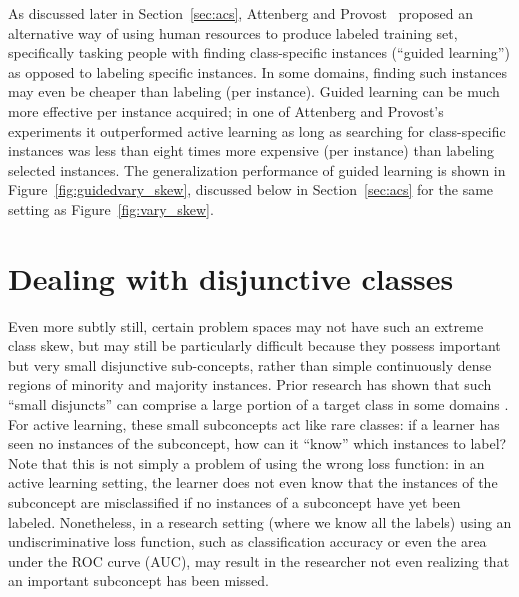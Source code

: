 As discussed later in Section~\ref{sec:acs}, Attenberg and Provost~\cite{attprovkdd2010} proposed an alternative way of using human resources to produce labeled training set, specifically tasking people with finding class-specific instances (``guided learning'') as opposed to labeling specific instances.  In some domains, finding such instances may even be cheaper than labeling (per instance).  Guided learning can be much more effective per instance acquired; in one of Attenberg and Provost's experiments it outperformed active learning as long as searching for class-specific instances was less than eight times more expensive (per instance) than labeling selected instances.  The generalization performance
of guided learning is shown in Figure~\ref{fig:guidedvary_skew}, discussed below in Section~\ref{sec:acs} for the same setting as Figure~\ref{fig:vary_skew}.

\section{Dealing with disjunctive classes}
\label{sec:disjunct}
Even more subtly still, certain problem spaces may not have such an extreme class skew, but may still be particularly difficult because they possess important but very small disjunctive sub-concepts, rather than simple continuously dense regions of minority and majority instances.
Prior research has shown that such ``small disjuncts'' can comprise a large portion of a target class in some domains \cite{WeissAIS2020}.
For active learning, these small subconcepts act like rare classes: if a learner has seen no instances of the subconcept, how can it ``know'' which instances to label? Note that this is not simply a problem of using the wrong loss function: in an active learning setting, the learner does not even know that the instances of the subconcept are misclassified if no instances of a subconcept have yet been labeled. Nonetheless, in a research setting (where we know all the labels) using an undiscriminative loss function, such as classification accuracy or even the area under the ROC curve (AUC), may result in the researcher not even realizing that an important subconcept has been missed.

